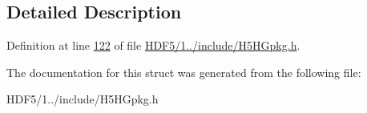 \subsection{Detailed Description}


Definition at line \hyperlink{_h_d_f5_21_810_81_2include_2_h5_h_gpkg_8h_source_l00122}{122} of file \hyperlink{_h_d_f5_21_810_81_2include_2_h5_h_gpkg_8h_source}{H\+D\+F5/1../include/\+H5\+H\+Gpkg.\+h}.



The documentation for this struct was generated from the following file\+:\begin{DoxyCompactItemize}
\item 
H\+D\+F5/1../include/\+H5\+H\+Gpkg.\+h\end{DoxyCompactItemize}
